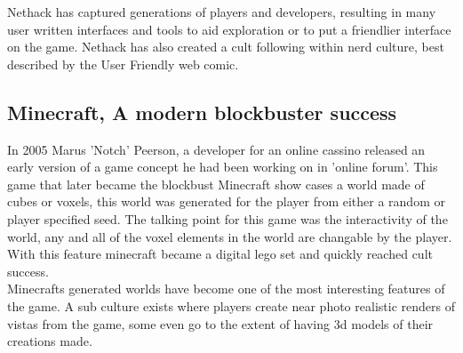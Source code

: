 Nethack has captured generations of players and developers, resulting in many 
user written interfaces and tools to aid exploration or to put a friendlier 
interface on the game. Nethack has also created a cult following within nerd 
culture, best described by the User Friendly web comic.\\

\subsection*{Minecraft, A modern blockbuster success}
In 2005 Marus 'Notch' Peerson, a developer for an online cassino released an
early version of a game concept he had been working on in 'online forum'. This
game that later became the blockbust Minecraft show cases a world made of cubes 
or voxels, this world was generated for the player from either a random or 
player specified seed. The talking point for this game was the interactivity of
the world, any and all of the voxel elements in the world are changable by the
player. With this feature minecraft became a digital lego set and quickly 
reached cult success.\\


Minecrafts generated worlds have become one of the most interesting features of 
the game. A sub culture exists where players create near photo realistic renders
of vistas from the game, some even go to the extent of having 3d models of their
creations made. 



 
